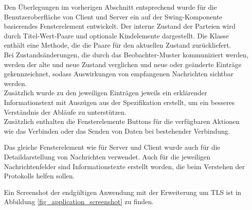 Den Überlegungen im vorherigen Abschnitt entsprechend wurde für die Benutzeroberfläche von Client und Server ein auf der Swing-Komponente  basierendes Fensterelement entwickelt. Der interne Zustand der Parteien wird durch Titel-Wert-Paare und optionale Kindelemente dargestellt. Die Klasse  enthält eine Methode, die die Paare für den aktuellen Zustand zurückliefert.\\
Bei Zustandsänderungen, die durch das Beobachter-Muster kommuniziert werden, werden der alte und neue Zustand verglichen und neue oder geänderte Einträge gekennzeichnet, sodass Auswirkungen von empfangenen Nachrichten sichtbar werden.\\
Zusätzlich wurde zu den jeweiligen Einträgen jeweils ein erklärender Informationstext mit Auszügen aus der Spezifikation erstellt, um ein besseres Verständnis der Abläufe zu unterstützen.\\
Zusätzlich enthalten die Fensterelemente Buttons für die verfügbaren Aktionen wie das Verbinden oder das Senden von Daten bei bestehender Verbindung.

Das gleiche Fensterelement wie für Server und Client wurde auch für die Detaildarstellung von Nachrichten verwendet. Auch für die jeweiligen Nachrichtenfelder sind Informationstexte erstellt worden, die beim Verstehen der Protokolls helfen sollen.

Ein Screenshot der endgültigen Anwendung mit der Erweiterung um TLS ist in Abbildung \ref{fig_application_screenshot} zu finden.